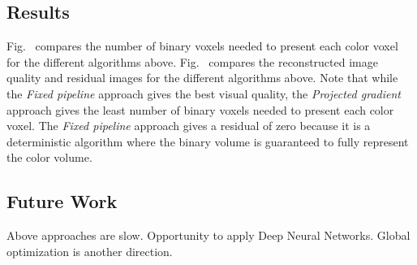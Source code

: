 \subsection{Results}


Fig.~ compares the number of binary voxels needed to present each color voxel for the different algorithms above. Fig.~ compares the reconstructed image quality and residual images for the different algorithms above. Note that while the \emph{Fixed pipeline} approach gives the best visual quality, the \emph{Projected gradient} approach gives the least number of binary voxels needed to present each color voxel. The \emph{Fixed pipeline} approach gives a residual of zero because it is a deterministic algorithm where the binary volume is guaranteed to fully represent the color volume.

\subsection{Future Work}
 Above approaches are slow. Opportunity to apply Deep Neural Networks. Global optimization is another direction.
